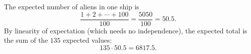 The expected number of aliens in one ship is
\[\dfrac{1+2+\cdots+100}{100}=\dfrac{5050}{100}=50.5.\]
By linearity of expectation (which needs no independence), the expected total is the sum of the $135$ expected values:
\[135\cdot50.5=\boxed{6817.5}.\]
